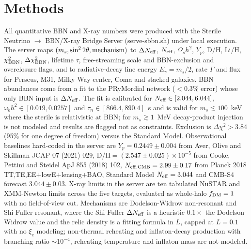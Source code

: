 \documentclass[11pt,a4paper]{article}
\begin{document}
\section{Methods}
All quantitative BBN and X-ray numbers were produced with the Sterile Neutrino $\to$ BBN/X-ray Bridge Server (serve-sbbn.sh) under local execution. The server maps $(m_{s},\sin^{2}2\theta,{\rm mechanism})$ to $\Delta N_{\rm eff}$, $N_{\rm eff}$, $\Omega_{s}h^{2}$, $Y_{p}$, D/H, Li/H, $\chi^{2}_{\rm BBN}$, $\Delta\chi^{2}_{\rm BBN}$, lifetime $\tau$, free-streaming scale and BBN-exclusion and overclosure flags, and to radiative-decay line energy $E_{\gamma}=m_{s}/2$, rate $\Gamma$ and flux for Perseus, M31, Milky Way center, Coma and stacked galaxies. BBN abundances come from a fit to the PRyMordial network ($<0.3\%$ error) whose only BBN input is $\Delta N_{\rm eff}$. The fit is calibrated for $N_{\rm eff}\in[2.044,6.044]$, $\omega_{b}h^{2}\in[0.019,0.0257]$ and $\tau_{n}\in[866.4,890.4]$~s and is valid for $m_{s}\lesssim100$~keV where the sterile is relativistic at BBN; for $m_{s}\gtrsim1$~MeV decay-product injection is not modeled and results are flagged not as constraints. Exclusion is $\Delta\chi^{2}>3.84$ (95\% for one degree of freedom) versus the Standard Model. Observational baselines hard-coded in the server are $Y_{p}=0.2449\pm0.004$ from Aver, Olive and Skillman JCAP 07 (2021) 029, D/H$=(2.547\pm0.025)\times10^{-5}$ from Cooke, Pettini and Steidel ApJ 855 (2018) 102, $N_{\rm eff,CMB}=2.99\pm0.17$ from Planck 2018 TT,TE,EE+lowE+lensing+BAO, Standard Model $N_{\rm eff}=3.044$ and CMB-S4 forecast $3.044\pm0.03$. X-ray limits in the server are ten tabulated NuSTAR and XMM-Newton limits across the five targets, evaluated as whole-halo $f_{\rm DM}=1$ with no field-of-view cut. Mechanisms are Dodelson-Widrow non-resonant and Shi-Fuller resonant, where the Shi-Fuller $\Delta N_{\rm eff}$ is a heuristic $0.1\times$ the Dodelson-Widrow value and the relic density is a fitting formula in $L$, capped at $L=0.1$ with no $\xi_{e}$ modeling; non-thermal reheating and inflaton-decay production with branching ratio $\sim10^{-4}$, reheating temperature and inflaton mass are not modeled.
\end{document}

